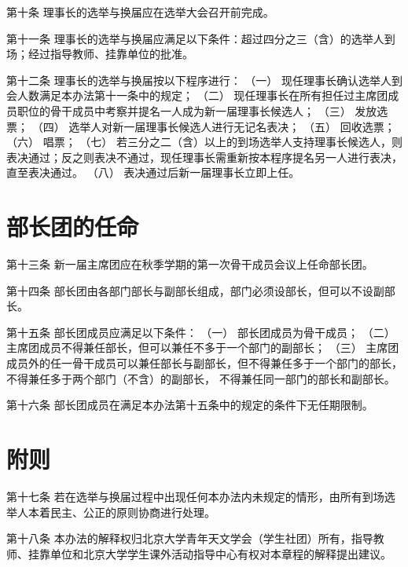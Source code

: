 第十条  理事长的选举与换届应在选举大会召开前完成。

第十一条  理事长的选举与换届应满足以下条件：超过四分之三（含）的选举人到场；经过指导教师、挂靠单位的批准。

第十二条  理事长的选举与换届按以下程序进行：
（一）  现任理事长确认选举人到会人数满足本办法第十一条中的规定；
（二）  现任理事长在所有担任过主席团成员职位的骨干成员中考察并提名一人成为新一届理事长候选人；
（三）  发放选票；
（四）  选举人对新一届理事长候选人进行无记名表决；
（五）  回收选票；
（六）  唱票；
（七）  若三分之二（含）以上的到场选举人支持理事长候选人，则表决通过；反之则表决不通过，现任理事长需重新按本程序提名另一人进行表决，直至表决通过。
（八）  表决通过后新一届理事长立即上任。

\section{部长团的任命}

第十三条  新一届主席团应在秋季学期的第一次骨干成员会议上任命部长团。

第十四条  部长团由各部门部长与副部长组成，部门必须设部长，但可以不设副部长。

第十五条  部长团成员应满足以下条件：
（一）  部长团成员为骨干成员；
（二）  主席团成员不得兼任部长，但可以兼任不多于一个部门的副部长；
（三）  主席团成员外的任一骨干成员可以兼任部长与副部长，但不得兼任多于一个部门的部长，不得兼任多于两个部门（不含）的副部长， 不得兼任同一部门的部长和副部长。

第十六条  部长团成员在满足本办法第十五条中的规定的条件下无任期限制。

\section{附则}

第十七条  若在选举与换届过程中出现任何本办法内未规定的情形，由所有到场选举人本着民主、公正的原则协商进行处理。

第十八条  本办法的解释权归北京大学青年天文学会（学生社团）所有，指导教师、挂靠单位和北京大学学生课外活动指导中心有权对本章程的解释提出建议。

